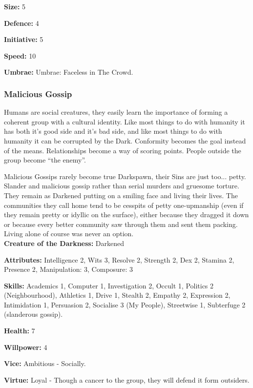 \noindent \textbf{Size:} 5

\noindent \textbf{Defence:} 4

\noindent \textbf{Initiative:} 5

\noindent \textbf{Speed:} 10

\noindent \textbf{Umbrae:} Umbrae: Faceless in The Crowd.


\subsubsection*{Malicious Gossip}

Humans are social creatures, they easily learn the importance of forming a coherent group with a cultural identity. Like most things to do with humanity it has both it's good side and it's bad side, and like most things to do with humanity it can be corrupted by the Dark. Conformity becomes the goal instead of the means. Relationships become a way of scoring points. People outside the group become “the enemy”.

Malicious Gossips rarely become true Darkspawn, their Sins are just too... petty. Slander and malicious gossip rather than serial murders and gruesome torture. They remain as Darkened putting on a smiling face and living their lives. The communities they call home tend to be cesspits of petty one-upmanship (even if they remain pretty or idyllic on the surface), either because they dragged it down or because every better community saw through them and sent them packing. Living alone of course was never an option.\\

\noindent \textbf{Creature of the Darkness:} Darkened

\noindent \textbf{Attributes:} Intelligence 2, Wits 3, Resolve 2, Strength 2, Dex 2, Stamina 2, Presence 2, Manipulation: 3, Composure: 3

\noindent \textbf{Skills:} Academics 1, Computer 1, Investigation 2, Occult 1, Politics 2 (Neighbourhood), Athletics 1, Drive 1, Stealth 2, Empathy 2, Expression 2, Intimidation 1, Persuasion 2, Socialise 3 (My People), Streetwise 1, Subterfuge 2 (slanderous gossip).

\noindent \textbf{Health:} 7

\noindent \textbf{Willpower:} 4

\noindent \textbf{Vice:} Ambitious - Socially.

\noindent \textbf{Virtue:} Loyal - Though a cancer to the group, they will defend it form outsiders.

